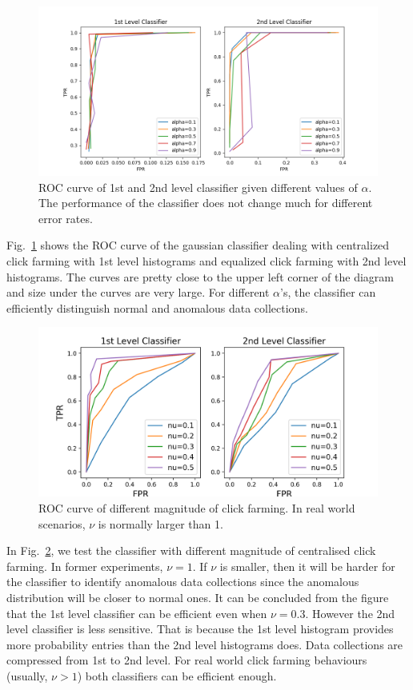 \documentclass[10pt,conference,letterpaper]{IEEEtran}
\begin{document}
			\begin{figure}[!t]
				\centering
				\includegraphics[width=\linewidth]{fig/ROC-Alpha.png}
				\caption{ROC curve of 1st and 2nd level classifier given different values of $\alpha$. The performance of the classifier does not change much for different error rates.}
				\label{fig:roc-alpha}
			\end{figure}
	
			Fig.~\ref{fig:roc-alpha} shows the ROC curve of the gaussian classifier dealing with centralized click farming with 1st level histograms and equalized click farming with 2nd level histograms. The curves are pretty close to the upper left corner of the diagram and size under the curves are very large. For different $\alpha$'s, the classifier can efficiently distinguish normal and anomalous data collections.
			
			\begin{figure}[!t]
				\centering
				\includegraphics[width=\linewidth]{fig/ROC-Nu.png}
				\caption{ROC curve of different magnitude of click farming. In real world scenarios, $\nu$ is normally larger than 1.}
				\label{fig:roc-magnitude}
			\end{figure}
	
			In Fig.~\ref{fig:roc-magnitude}, we test the classifier with different magnitude of centralised click farming. In former experiments, $\nu = 1$. If $\nu $ is smaller, then it will be harder for the classifier to identify anomalous data collections since the anomalous distribution will be closer to normal ones. It can be concluded from the figure that the 1st level classifier can be efficient even when $\nu = 0.3$. However the 2nd level classifier is less sensitive. That is because the 1st level histogram provides more probability entries than the 2nd level histograms does. Data collections are compressed from 1st to 2nd level. For real world click farming behaviours (usually, $\nu > 1$) both classifiers can be efficient enough.
	
\end{document}
